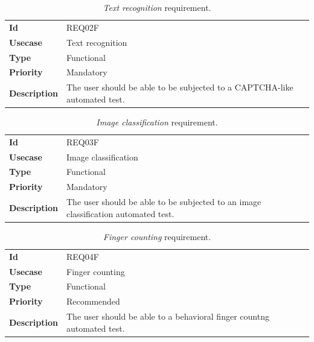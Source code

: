 \begin{table}[h!t]
    \centering
    \caption{\emph{Text recognition} requirement.}
    \label{tab:req:text}
    \centering
    \begin{tabular}{l | p{80mm}}
        \textbf{Id}          & REQ02F                                                                    \\
        \textbf{Usecase}     & Text recognition                                                          \\
        \textbf{Type}        & Functional                                                                \\
        \textbf{Priority}    & Mandatory                                                                 \\
        \textbf{Description} & The user should be able to be subjected to a CAPTCHA-like automated test.
    \end{tabular}
\end{table}

\begin{table}[h!t]
    \centering
    \caption{\emph{Image classification} requirement.}
    \label{tab:req:image}
    \centering
    \begin{tabular}{l | p{80mm}}
        \textbf{Id}          & REQ03F                                                                             \\
        \textbf{Usecase}     & Image classification                                                               \\
        \textbf{Type}        & Functional                                                                         \\
        \textbf{Priority}    & Mandatory                                                                          \\
        \textbf{Description} & The user should be able to be subjected to an image classification automated test.
    \end{tabular}
\end{table}

\begin{table}[h!t]
    \centering
    \caption{\emph{Finger counting} requirement.}
    \label{tab:req:finger}
    \centering
    \begin{tabular}{l | p{80mm}}
        \textbf{Id}          & REQ04F                                                                 \\
        \textbf{Usecase}     & Finger counting                                                        \\
        \textbf{Type}        & Functional                                                             \\
        \textbf{Priority}    & Recommended                                                            \\
        \textbf{Description} & The user should be able to a behavioral finger countng automated test.
    \end{tabular}
\end{table}

